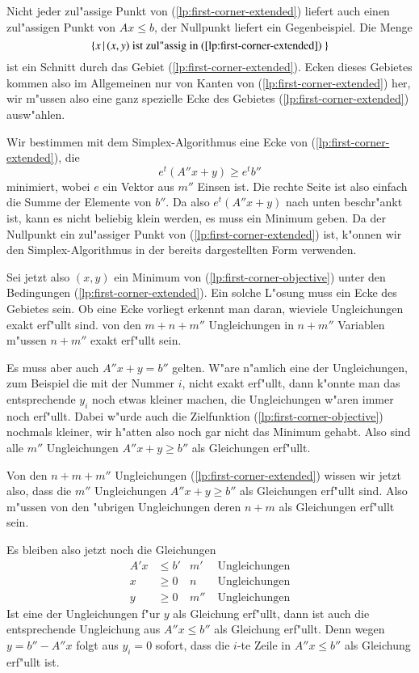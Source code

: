 Nicht jeder zul"assige Punkt von
(\ref{lp:first-corner-extended}) 
liefert auch einen zul"assigen Punkt von $Ax\le b$, der Nullpunkt
liefert ein Gegenbeispiel.
Die Menge
\[
\{ x\, |\, \text{$(x,y)$ ist zul"assig in 
(\ref{lp:first-corner-extended}) }\}
\]
ist ein Schnitt durch das
Gebiet (\ref{lp:first-corner-extended}).
Ecken dieses Gebietes kommen also im Allgemeinen nur von Kanten
von (\ref{lp:first-corner-extended}) her, wir m"ussen also eine
ganz spezielle Ecke
des Gebietes (\ref{lp:first-corner-extended}) ausw"ahlen.

Wir bestimmen mit dem Simplex-Algorithmus eine Ecke von
(\ref{lp:first-corner-extended}), die 
\begin{equation}
e^t (A''x + y) \ge e^t b''
\label{lp:first-corner-objective}
\end{equation}
minimiert, wobei $e$ ein Vektor aus $m''$ Einsen ist.
Die rechte Seite ist also einfach die Summe der Elemente von $b''$.
Da also $e^t(A''x+y)$ nach unten beschr"ankt ist, kann es nicht
beliebig klein werden, es muss ein Minimum geben.
Da der Nullpunkt
ein zul"assiger Punkt von (\ref{lp:first-corner-extended}) ist,
k"onnen wir den Simplex-Algorithmus in der bereits
dargestellten Form verwenden.

Sei jetzt also  $(x,y)$ ein Minimum von
(\ref{lp:first-corner-objective})
unter den Bedingungen (\ref{lp:first-corner-extended}).
Ein solche L"osung muss ein Ecke des Gebietes sein.
Ob eine Ecke vorliegt erkennt man daran, wieviele Ungleichungen
exakt erf"ullt sind. 
von den $m+n+m''$ Ungleichungen in $n+m''$ Variablen m"ussen $n+m''$
exakt erf"ullt sein.

Es muss aber auch $A''x+y=b''$ gelten.
W"are n"amlich eine der Ungleichungen, zum Beispiel die mit der Nummer $i$,
nicht exakt erf"ullt, dann k"onnte man das entsprechende $y_i$ noch
etwas kleiner machen, die Ungleichungen w"aren immer noch erf"ullt.
Dabei w"urde auch die Zielfunktion
(\ref{lp:first-corner-objective})
nochmals kleiner, wir h"atten also noch gar nicht das Minimum gehabt.
Also sind alle $m''$ Ungleichungen $A''x+y\ge b''$ als Gleichungen
erf"ullt.

Von den $n+m+m''$ Ungleichungen 
(\ref{lp:first-corner-extended})
wissen wir jetzt also, dass die $m''$ Ungleichungen $A''x+y\ge b''$
als Gleichungen erf"ullt sind.
Also m"ussen von den "ubrigen Ungleichungen
deren $n+m$ als Gleichungen erf"ullt sein.

Es bleiben also jetzt noch die Gleichungen
\begin{align*}
A'x&\le b' & m'&\;\text{Ungleichungen}\\
x  &\ge 0  &  n&\;\text{Ungleichungen}\\
y  &\ge 0  &m''&\;\text{Ungleichungen}
\end{align*}
Ist eine der Ungleichungen f"ur $y$ als Gleichung erf"ullt, dann
ist auch die entsprechende Ungleichung aus $A''x\le b''$ als
Gleichung erf"ullt. Denn wegen $y=b''-A''x$ folgt aus $y_i=0$
sofort, dass die $i$-te Zeile in $A''x\le b''$ als Gleichung
erf"ullt ist.

